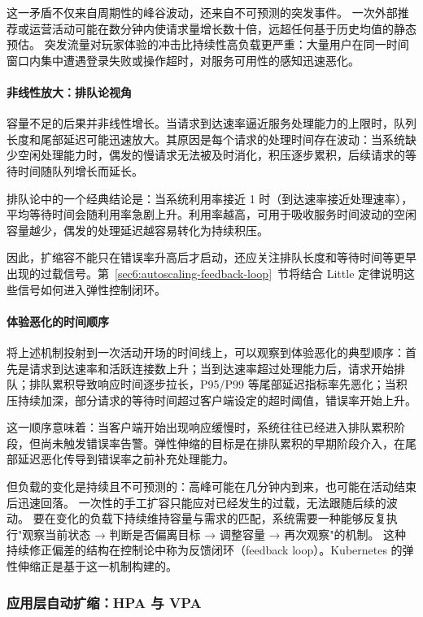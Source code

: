这一矛盾不仅来自周期性的峰谷波动，还来自不可预测的突发事件。
一次外部推荐或运营活动可能在数分钟内使请求量增长数十倍，远超任何基于历史均值的静态预估。
突发流量对玩家体验的冲击比持续性高负载更严重：大量用户在同一时间窗口内集中遭遇登录失败或操作超时，对服务可用性的感知迅速恶化。

\paragraph{非线性放大：排队论视角}

容量不足的后果并非线性增长。当请求到达速率逼近服务处理能力的上限时，队列长度和尾部延迟可能迅速放大。其原因是每个请求的处理时间存在波动：当系统缺少空闲处理能力时，偶发的慢请求无法被及时消化，积压逐步累积，后续请求的等待时间随队列增长而延长。

排队论中的一个经典结论是：当系统利用率接近 1 时（到达速率接近处理速率），平均等待时间会随利用率急剧上升。利用率越高，可用于吸收服务时间波动的空闲容量越少，偶发的处理延迟越容易转化为持续积压。

因此，扩缩容不能只在错误率升高后才启动，还应关注排队长度和等待时间等更早出现的过载信号。第~\ref{sec6:autoscaling-feedback-loop}~节将结合 Little 定律说明这些信号如何进入弹性控制闭环。

\paragraph{体验恶化的时间顺序}

将上述机制投射到一次活动开场的时间线上，可以观察到体验恶化的典型顺序：首先是请求到达速率和活跃连接数上升；当到达速率超过处理能力后，请求开始排队；排队累积导致响应时间逐步拉长，P95/P99 等尾部延迟指标率先恶化；当积压持续加深，部分请求的等待时间超过客户端设定的超时阈值，错误率开始上升。

这一顺序意味着：当客户端开始出现响应缓慢时，系统往往已经进入排队累积阶段，但尚未触发错误率告警。弹性伸缩的目标是在排队累积的早期阶段介入，在尾部延迟恶化传导到错误率之前补充处理能力。

但负载的变化是持续且不可预测的：高峰可能在几分钟内到来，也可能在活动结束后迅速回落。
一次性的手工扩容只能应对已经发生的过载，无法跟随后续的波动。
要在变化的负载下持续维持容量与需求的匹配，系统需要一种能够反复执行"观察当前状态 → 判断是否偏离目标 → 调整容量 → 再次观察"的机制。
这种持续修正偏差的结构在控制论中称为反馈闭环（feedback loop）。Kubernetes 的弹性伸缩正是基于这一机制构建的。

\subsubsection{应用层自动扩缩：HPA 与 VPA}


